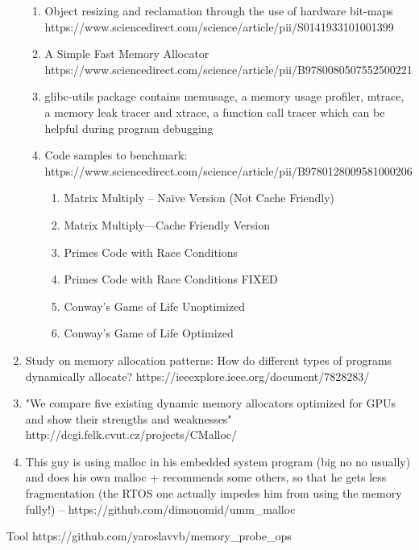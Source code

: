 \documentclass{article}
\begin{document}
\begin{enumerate}
\begin{enumerate}
        \item Object resizing and reclamation through the use of hardware bit-maps \\
        https://www.sciencedirect.com/science/article/pii/S0141933101001399
        \item A Simple Fast Memory Allocator \\
        https://www.sciencedirect.com/science/article/pii/B9780080507552500221
        \item glibc-utils package contains memusage, a memory usage profiler, mtrace, a memory leak tracer and xtrace, a function call tracer which can be helpful during program debugging
        \item Code samples to benchmark: https://www.sciencedirect.com/science/article/pii/B9780128009581000206
        \begin{enumerate}
            \item Matrix Multiply – Naïve Version (Not Cache Friendly)
            \item Matrix Multiply—Cache Friendly Version
            \item Primes Code with Race Conditions
            \item Primes Code with Race Conditions FIXED
            \item Conway’s Game of Life Unoptimized
            \item Conway’s Game of Life Optimized
        \end{enumerate}
    \end{enumerate}
        
    \item{Study on memory allocation patterns: How do different types of programs dynamically allocate? https://ieeexplore.ieee.org/document/7828283/}
    \item "We compare five existing dynamic memory allocators optimized for GPUs and show their strengths and weaknesses" \\
    http://dcgi.felk.cvut.cz/projects/CMalloc/
    \item This guy is using malloc in his embedded system program (big no no usually) and does his own malloc + recommends some others, so that he gets less fragmentation (the RTOS one actually impedes him from using the memory fully!) -- https://github.com/dimonomid/umm\_malloc

\end{enumerate}

Tool https://github.com/yaroslavvb/memory\_probe\_ops
\end{document}
